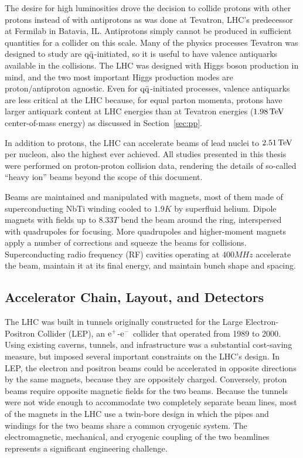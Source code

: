 The desire for high luminosities drove the decision to collide protons with other protons instead of with antiprotons as was done at Tevatron, LHC's predecessor at Fermilab in Batavia, IL\@.
Antiprotons simply cannot be produced in sufficient quantities for a collider on this scale.
Many of the physics processes Tevatron was designed to study are $\mathrm{q}\bar{\mathrm{q}}$-initiated, so it is useful to have valence antiquarks available in the collisions.
The LHC was designed with Higgs boson production in mind, and the two most important Higgs production modes are proton/antiproton agnostic.
Even for $\mathrm{q}\bar{\mathrm{q}}$-initiated processes, valence antiquarks are less critical at the LHC because, for equal parton momenta, protons have larger antiquark content at LHC energies than at Tevatron energies ($1.98\,\mathrm{Te\hspace{-.08em}V}$ center-of-mass energy) as discussed in Section~\ref{sec:pp}.

In addition to protons, the LHC can accelerate beams of lead nuclei to $2.51\,\mathrm{Te\hspace{-.08em}V}$ per nucleon, also the highest ever achieved.
All studies presented in this thesis were performed on proton-proton collision data, rendering the details of so-called ``heavy ion'' beams beyond the scope of this document.

Beams are maintained and manipulated with magnets, most of them made of superconducting NbTi winding cooled to $1.9\unit{K}$ by superfluid helium.
Dipole magnets with fields up to $8.33\unit{T}$ bend the beam around the ring, interspersed with quadrupoles for focusing.
More quadrupoles and higher-moment magnets apply a number of corrections and squeeze the beams for collisions.
Superconducting radio frequency (RF) cavities operating at $400\unit{MHz}$ accelerate the beam, maintain it at its final energy, and maintain bunch shape and spacing.


\subsection{Accelerator Chain, Layout, and Detectors}
The LHC was built in tunnels originally constructed for the Large Electron-Positron Collider (LEP), an $\mathrm{e}^+$-$\mathrm{e}^-$ collider that operated from 1989 to 2000.
Using existing caverns, tunnels, and infrastructure was a substantial cost-saving measure, but imposed several important constraints on the LHC's design.
In LEP, the electron and positron beams could be accelerated in opposite directions by the same magnets, because they are oppositely charged.
Conversely, proton beams require opposite magnetic fields for the two beams.
Because the tunnels were not wide enough to accommodate two completely separate beam lines, most of the magnets in the LHC use a twin-bore design in which the pipes and windings for the two beams share a common cryogenic system.
The electromagnetic, mechanical, and cryogenic coupling of the two beamlines represents a significant engineering challenge.

